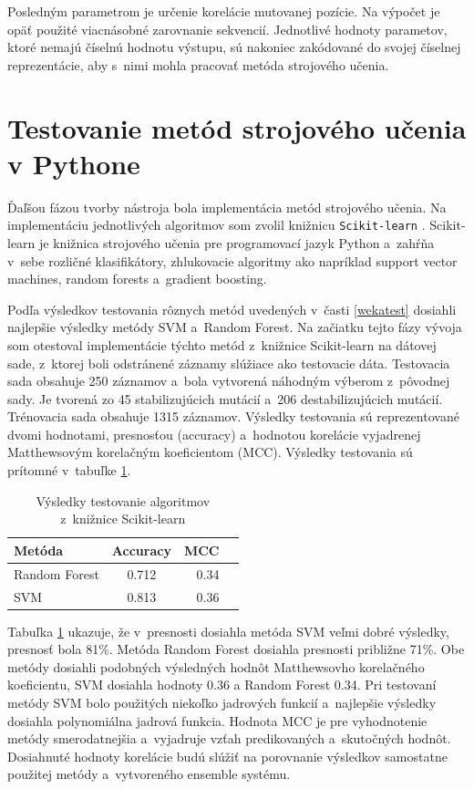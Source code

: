 Posledným parametrom je určenie korelácie mutovanej pozície. Na výpočet je opäť použité viacnásobné zarovnanie sekvencií. Jednotlivé hodnoty parametov, ktoré nemajú číselnú hodnotu výstupu, sú nakoniec zakódované do svojej číselnej reprezentácie, aby s~nimi mohla pracovať metóda strojového učenia.

\section{Testovanie metód strojového učenia v Pythone}

Ďaľšou fázou tvorby nástroja bola implementácia metód strojového učenia. Na implementáciu jednotlivých algoritmov som zvolil knižnicu {\tt Scikit-learn} \cite{scikit-learn}. Scikit-learn je knižnica strojového učenia pre programovací jazyk Python a~zahŕňa v~sebe rozličné klasifikátory, zhlukovacie algoritmy ako napríklad support vector machines, random forests a~gradient boosting.

Podľa výsledkov testovania rôznych metód uvedených v~časti \ref{wekatest} dosiahli najlepšie výsledky metódy SVM a~Random Forest. Na začiatku tejto fázy vývoja som otestoval implementácie týchto metód z~knižnice Scikit-learn na dátovej sade, z~ktorej boli odstránené záznamy slúžiace ako testovacie dáta. Testovacia sada obsahuje 250 záznamov a~bola vytvorená náhodným výberom z~pôvodnej sady. Je tvorená zo 45 stabilizujúcich mutácií a~206 destabilizujúcich mutácií. Trénovacia sada obsahuje 1315 záznamov. Výsledky testovania sú reprezentované dvomi hodnotami, presnosťou (accuracy) a~hodnotou korelácie vyjadrenej Matthewsovým korelačným koeficientom (MCC). Výsledky testovania sú prítomné v~tabuľke \ref{scikittest}.
\begin{table}[H]
	\centering
	\begin{tabular}{ | l | c | r | l| }
		\hline 
		Metóda  & Accuracy & MCC \\ \hline
		Random Forest & 0.712 & 0.34\\ \hline
		SVM & 0.813 & 0.36 \\\hline
	\end{tabular}
	\caption {Výsledky testovanie algoritmov z~knižnice Scikit-learn} \label{scikittest} 
\end{table}

Tabuľka \ref{scikittest} ukazuje, že v~presnosti dosiahla metóda SVM veľmi dobré výsledky, presnosť bola 81\%. Metóda Random Forest dosiahla presnosti približne 71\%. Obe metódy dosiahli podobných výsledných hodnôt Matthewsovho korelačného koeficientu, SVM dosiahla hodnoty 0.36 a Random Forest 0.34. Pri testovaní metódy SVM bolo použitých niekoľko jadrových funkcií a~najlepšie výsledky dosiahla polynomiálna jadrová funkcia. Hodnota MCC je pre vyhodnotenie metódy smerodatnejšia a~vyjadruje vzťah predikovaných a~skutočných hodnôt. Dosiahnuté hodnoty korelácie budú slúžiť na porovnanie výsledkov samostatne použitej metódy a~vytvoreného ensemble systému.

